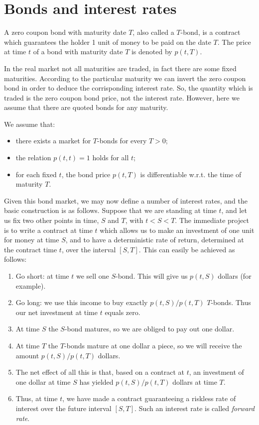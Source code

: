 \section{Bonds and interest rates} %
\begin{definition}
    A zero coupon bond with maturity date $T$, also called a $T$-bond, is a contract which guarantees the holder 1 unit of money to be paid on the date $T$. The price at time $t$ of a bond with maturity date $T$ is denoted by $p(t, T)$.
\end{definition}
In the real market not all maturities are traded, in fact there are some fixed maturities. According to the particular maturity we can invert the zero coupon bond in order to deduce the corrisponding interest rate. So, the quantity which is traded is the zero coupon bond price, not the interest rate. However, here we assume that there are quoted bonds for any maturity.
\begin{assumption}
    We assume that:
    \begin{itemize}
        \item there exists a market for $T$-bonds for every $T > 0$;
        \item the relation $p(t, t) = 1$ holds for all $t$;
        \item for each fixed $t$, the bond price $p(t, T)$ is differentiable w.r.t. the time of maturity $T$.
    \end{itemize}
\end{assumption}
Given this bond market, we may now define a number of interest rates, and the basic construction is as follows. Suppose that we are standing at time $t$, and let us fix two other points in time, $S$ and $T$, with $t < S < T$. The immediate project is to write a contract at time $t$ which allows us to make an investment of one unit for money at time $S$, and to have a deterministic rate of return, determined at the contract time $t$, over the interval $[S,T]$. This can easily be achieved as follows:
\begin{enumerate}
    \item Go short: at time $t$ we sell one $S$-bond. This will give us $p(t,S)$ dollars (for example).
    \item Go long: we use this income to buy exactly $p(t,S)/p(t,T)$ $T$-bonds. Thus our net investment at time $t$ equals zero.
    \item At time $S$ the $S$-bond matures, so we are obliged to pay out one dollar.
    \item At time $T$ the $T$-bonds mature at one dollar a piece, so we will receive the amount $p(t, S)/p(t, T)$ dollars.
    \item The net effect of all this is that, based on a contract at $t$, an investment of one dollar at time $S$ has yielded $p(t, S)/p(t, T)$ dollars at time $T$.
    \item Thus, at time $t$, we have made a contract guaranteeing a riskless rate of interest over the future interval $[S,T]$. Such an interest rate is called \emph{forward rate}.
\end{enumerate}
